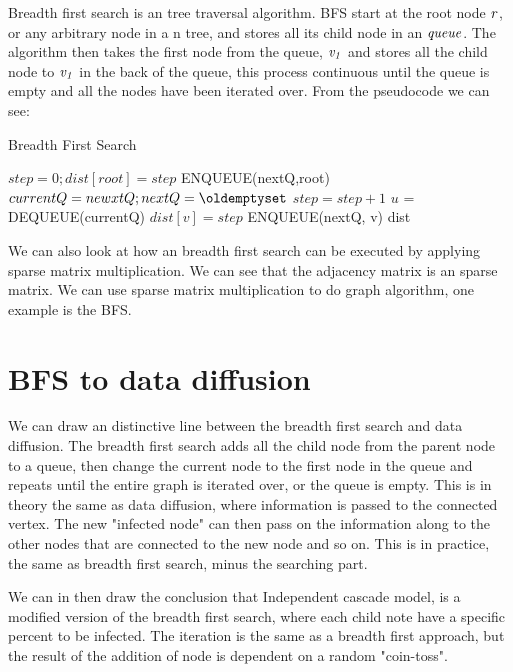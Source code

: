 Breadth first search is an tree traversal algorithm. BFS start at the root node $\it{r}$, or any arbitrary node in a n tree, and stores all its child node in an $\it{queue}$. The algorithm then takes the first node from the queue, $\it{v_1}$ and stores all the child node to $\it{v_1}$ in the back of the queue, this process continuous until the queue is empty and all the nodes have been iterated over. From the pseudocode we can see:

\begin{algorithm}
\caption{Breadth First Search}
\begin{algorithmic}[1]
\State $step = 0; dist[root] = step$
\State ENQUEUE(nextQ,root)
\State $currentQ = newxtQ; nextQ = \oldemptyset$
\State $step = step+1$
\State$ u$ = DEQUEUE(currentQ)
\State $dist[v] = step$
\State ENQUEUE(nextQ, v)
\EndIf
\EndFor
\EndWhile
\EndWhile
\Return dist
\end{algorithmic}
\end{algorithm}

We can also look at how an breadth first search can be executed by applying  sparse matrix multiplication. We can see that the adjacency matrix is an sparse matrix. We can use sparse matrix multiplication to do graph algorithm, one example is the BFS. 


\section{BFS to data diffusion}
We can draw an distinctive line between the breadth first search and data diffusion. The breadth first search adds all the child node from the parent node to a queue, then change the current node to the first node in the queue and repeats until the entire graph is iterated over, or the queue is empty. This is in theory the same as data diffusion, where information is passed to the connected vertex. The new "infected node" can then pass on the information along to the other nodes that are connected to the new node and so on. This is in practice, the same as breadth first search, minus the searching part. 

We can in then draw the conclusion that Independent cascade model, is a modified version of the breadth first search, where each child note have a specific percent to be infected. The iteration is the same as a breadth first approach, but the result of the addition of node is dependent on a random "coin-toss".


